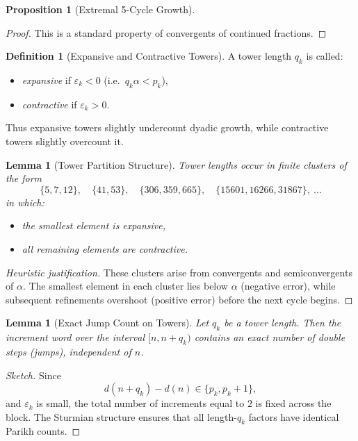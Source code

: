\documentclass[12pt, oneside]{article}
\numberwithin{equation}{section}
\theoremstyle{definition}
\newtheorem{definition}{Definition}[section]
\newtheorem{proposition}{Proposition}[section]
\theoremstyle{plain}
\newtheorem{lemma}[theorem]{Lemma}
\theoremstyle{remark}
\begin{document}
\begin{proposition}[Extremal 5-Cycle Growth]
\begin{proof}
This is a standard property of convergents of continued fractions.
\end{proof}


\begin{definition}[Expansive and Contractive Towers]
A tower length $q_k$ is called:
\begin{itemize}
\item \emph{expansive} if $\varepsilon_k < 0$ (i.e.\ $q_k\alpha < p_k$),
\item \emph{contractive} if $\varepsilon_k > 0$.
\end{itemize}
\end{definition}

Thus expansive towers slightly undercount dyadic growth, while
contractive towers slightly overcount it.


\begin{lemma}[Tower Partition Structure]
\label{lem:tower-partition}
Tower lengths occur in finite clusters of the form
\[
\{5,7,12\},\quad
\{41,53\},\quad
\{306,359,665\},\quad
\{15601,16266,31867\},\ \dots
\]
in which:
\begin{itemize}
\item the smallest element is expansive,
\item all remaining elements are contractive.
\end{itemize}
\end{lemma}

\begin{proof}[Heuristic justification]
These clusters arise from convergents and semiconvergents of $\alpha$.
The smallest element in each cluster lies below $\alpha$ (negative error),
while subsequent refinements overshoot (positive error) before the next
cycle begins.
\end{proof}


\begin{lemma}[Exact Jump Count on Towers]
\label{lem:exact-jumps}
Let $q_k$ be a tower length.  Then the increment word over the interval
$[n,n+q_k)$ contains an exact number of double steps (jumps), independent
of $n$.
\end{lemma}

\begin{proof}[Sketch]
Since
\[
d(n+q_k)-d(n) \in \{p_k, p_k+1\},
\]
and $\varepsilon_k$ is small, the total number of increments equal to $2$
is fixed across the block.  The Sturmian structure ensures that all
length-$q_k$ factors have identical Parikh counts.
\end{proof}


\end{proposition}
\end{document}
